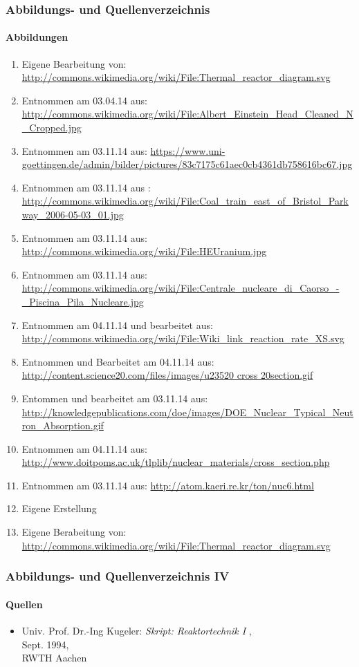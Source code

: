\documentclass{beamer}[9pt]
\begin{document}
\begin{frame}[allowframebreaks]
\frametitle{Abbildungs- und Quellenverzeichnis}
\framesubtitle{Abbildungen}

  \begin{enumerate}
     \item Eigene Bearbeitung von:\\
     \url{http://commons.wikimedia.org/wiki/File:Thermal_reactor_diagram.svg}
     \item Entnommen am 03.04.14 aus:\\
     \url{http://commons.wikimedia.org/wiki/File:Albert_Einstein_Head_Cleaned_N_Cropped.jpg}
     \item Entnommen am 03.11.14 aus:
     \url{https://www.uni-goettingen.de/admin/bilder/pictures/83c7175c61aec0cb4361db758616bc67.jpg}
     \item Entnommen am 03.11.14 aus : \\
     \url{http://commons.wikimedia.org/wiki/File:Coal_train_east_of_Bristol_Parkway_2006-05-03_01.jpg}
     \item Entnommen am 03.11.14 aus:\\
     \url{http://commons.wikimedia.org/wiki/File:HEUranium.jpg}
     \item Entnommen am 03.11.14 aus:\\
     \url{http://commons.wikimedia.org/wiki/File:Centrale_nucleare_di_Caorso_-_Piscina_Pila_Nucleare.jpg}
     \item Entnommen am 04.11.14 und bearbeitet aus:
     \url{http://commons.wikimedia.org/wiki/File:Wiki_link_reaction_rate_XS.svg}
     \item Entnommen und Bearbeitet am 04.11.14 aus:
     \url{http://content.science20.com/files/images/u23520 cross 20section.gif}
     \item Entommen und bearbeitet am 03.11.14 aus:\\
     \url{http://knowledgepublications.com/doe/images/DOE_Nuclear_Typical_Neutron_Absorption.gif}
     \item Entnommen am 04.11.14 aus:
     \url{http://www.doitpoms.ac.uk/tlplib/nuclear_materials/cross_section.php}
     \item Entnommen am 03.11.14 aus:
     \url{http://atom.kaeri.re.kr/ton/nuc6.html}
     \item Eigene Erstellung
     \item Eigene Berabeitung von:
     \url{http://commons.wikimedia.org/wiki/File:Thermal_reactor_diagram.svg}
  \end{enumerate}
\end{frame}
\begin{frame}
\frametitle{Abbildungs- und Quellenverzeichnis IV}
\framesubtitle{Quellen}
\begin{itemize}
\item Univ. Prof. Dr.-Ing Kugeler: \textit{Skript: Reaktortechnik I} ,\\ Sept. 1994,\\RWTH Aachen
\end{itemize}
\end{frame}
\end{document}
